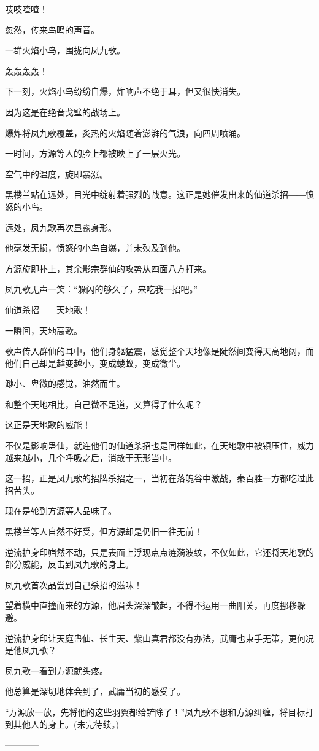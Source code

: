 \begin{this_body}
吱吱喳喳！

忽然，传来鸟鸣的声音。

一群火焰小鸟，围拢向凤九歌。

轰轰轰轰！

下一刻，火焰小鸟纷纷自爆，炸响声不绝于耳，但又很快消失。

因为这是在绝音戈壁的战场上。

爆炸将凤九歌覆盖，炙热的火焰随着澎湃的气浪，向四周喷涌。

一时间，方源等人的脸上都被映上了一层火光。

空气中的温度，旋即暴涨。

黑楼兰站在远处，目光中绽射着强烈的战意。这正是她催发出来的仙道杀招――愤怒的小鸟。

远处，凤九歌再次显露身形。

他毫发无损，愤怒的小鸟自爆，并未殃及到他。

方源旋即扑上，其余影宗群仙的攻势从四面八方打来。

凤九歌无声一笑：“躲闪的够久了，来吃我一招吧。”

仙道杀招――天地歌！

一瞬间，天地高歌。

歌声传入群仙的耳中，他们身躯猛震，感觉整个天地像是陡然间变得天高地阔，而他们自己却是越变越小，变成蝼蚁，变成微尘。

渺小、卑微的感觉，油然而生。

和整个天地相比，自己微不足道，又算得了什么呢？

这正是天地歌的威能！

不仅是影响蛊仙，就连他们的仙道杀招也是同样如此，在天地歌中被镇压住，威力越来越小，几个呼吸之后，消散于无形当中。

这一招，正是凤九歌的招牌杀招之一，当初在落魄谷中激战，秦百胜一方都吃过此招苦头。

现在是轮到方源等人品味了。

黑楼兰等人自然不好受，但方源却是仍旧一往无前！

逆流护身印岿然不动，只是表面上浮现点点涟漪波纹，不仅如此，它还将天地歌的部分威能，反击到凤九歌的身上。

凤九歌首次品尝到自己杀招的滋味！

望着横中直撞而来的方源，他眉头深深皱起，不得不运用一曲阳关，再度挪移躲避。

逆流护身印让天庭蛊仙、长生天、紫山真君都没有办法，武庸也束手无策，更何况是他凤九歌？

凤九歌一看到方源就头疼。

他总算是深切地体会到了，武庸当初的感受了。

“方源放一放，先将他的这些羽翼都给铲除了！”凤九歌不想和方源纠缠，将目标打到其他人的身上。(未完待续。)

------------

\end{this_body}

